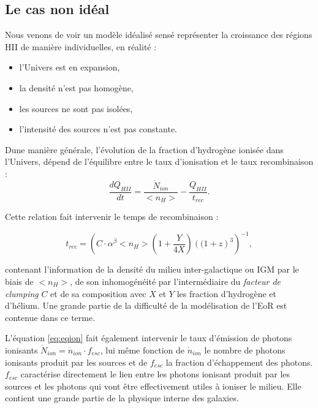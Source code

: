 \subsection{Le cas non idéal}

Nous venons de voir un modèle idéalisé sensé représenter la croissance des régions HII de manière individuelles, en réalité : 
\begin{itemize}
\item l'Univers est en expansion,
\item la densité n'est pas homogène,%
\item les sources ne sont pas isolées,
\item l'intensité des sources n'est pas constante. %
\end{itemize}

Dune manière générale, l'évolution de la fraction d'hydrogène ionisée dans l'Univers, dépend de l'équilibre entre le taux d'ionisation et le taux recombinaison \citep{0004-637X-514-2-648, RevModPhys.81.1405} :
\begin{equation}
\frac{dQ_{HII}}{dt} = \frac{\dot{N}_{ion}}{ <n_H>} - \frac{Q_{HII}}{t_{rec}}.
\label{eq:eqion}
\end{equation}

Cette relation fait intervenir le temps de recombinaison :

\begin{equation}
t_{rec} = \left( C\cdot \alpha^\beta <n_H> \left( 1+\frac{Y}{4X}\right) \left((1+z\right)^3  \right)^{-1}, 
\end{equation}

contenant l'information de la densité du milieu inter-galactique ou \ac{IGM} par le biais de $<n_H>$, de son inhomogénéité par l'intermédiaire du \textit{facteur de clumping} $C$ et de sa composition avec $X$ et $Y$ les fraction d'hydrogène et d'hélium.
Une grande partie de la difficulté de la modélisation de l'\ac{EoR} est contenue dans ce terme.

L'équation \ref{eq:eqion} fait également intervenir le taux d'émission de photons ionisants $\dot{N}_{ion}= \dot{n}_{ion} \cdot f_{esc}$, lui même fonction de $\dot{n}_{ion}$ le nombre de photons ionisants produit par les sources et de $f_{esc}$ la fraction d'échappement des photons. 
$f_{esc}$ caractérise directement le lien entre les photons ionisant produit par les sources et les photons qui vont être effectivement utiles à ioniser le milieu.
Elle contient une grande partie de la physique interne des galaxies.

